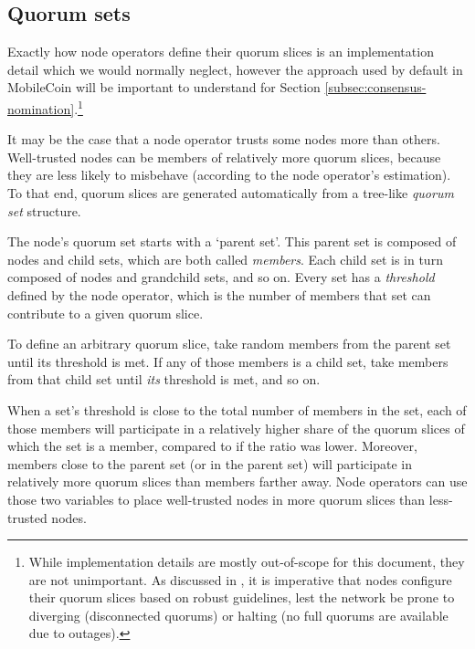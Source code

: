 \subsection{Quorum sets}
\label{subsec:consensus-quorum-sets}

Exactly how node operators define their quorum slices is an implementation detail which we would normally neglect, however the approach used by default in MobileCoin will be important to understand for Section \ref{subsec:consensus-nomination}.\footnote{While implementation details are mostly out-of-scope for this document, they are not unimportant. As discussed in \cite{fast-secure-global-payments-stellar}, it is imperative that nodes configure their quorum slices based on robust guidelines, lest the network be prone to diverging (disconnected quorums) or halting (no full quorums are available due to outages).}

It may be the case that a node operator trusts some nodes more than others. Well-trusted nodes can be members of relatively more quorum slices, because they are less likely to misbehave (according to the node operator's estimation). To that end, quorum slices are generated automatically from a tree-like {\em quorum set} structure.

The node's quorum set starts with a `parent set'. This parent set is composed of nodes and child sets, which are both called {\em members}. Each child set is in turn composed of nodes and grandchild sets, and so on. Every set has a {\em threshold} defined by the node operator, which is the number of members that set can contribute to a given quorum slice.

To define an arbitrary quorum slice, take random members from the parent set until its threshold is met. If any of those members is a child set, take members from that child set until {\em its} threshold is met, and so on.

When a set's threshold is close to the total number of members in the set, each of those members will participate in a relatively higher share of the quorum slices of which the set is a member, compared to if the ratio was lower. Moreover, members close to the parent set (or in the parent set) will participate in relatively more quorum slices than members farther away. Node operators can use those two variables to place well-trusted nodes in more quorum slices than less-trusted nodes.



